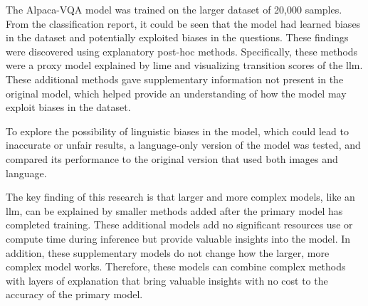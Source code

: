The Alpaca-VQA model was trained on the larger dataset of 20,000 samples. From the classification report, it could be seen that the model had learned biases in the dataset and potentially exploited biases in the questions. These findings were discovered using explanatory post-hoc methods. Specifically, these methods were a proxy model explained by \gls{lime} and visualizing transition scores of the \gls{llm}. These additional methods gave supplementary information not present in the original model, which helped provide an understanding of how the model may exploit biases in the dataset. 

To explore the possibility of linguistic biases in the model, which could lead to inaccurate or unfair results, a language-only version of the model was tested, and compared its performance to the original version that used both images and language.

The key finding of this research is that larger and more complex models, like an \gls{llm}, can be explained by smaller methods added after the primary model has completed training. These additional models add no significant resources use or compute time during inference but provide valuable insights into the model. In addition, these supplementary models do not change how the larger, more complex model works. Therefore, these models can combine complex methods with layers of explanation that bring valuable insights with no cost to the accuracy of the primary model. 


